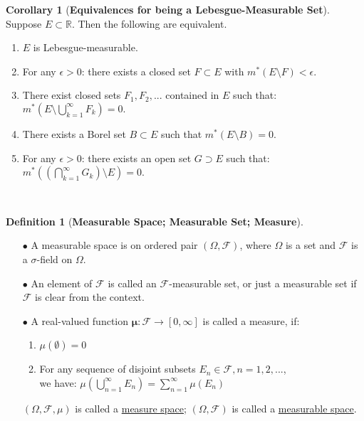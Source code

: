 \documentclass[reqno]{amsart}
\theoremstyle{definition}
\newtheorem{definition}{Definition}
\newtheorem{corollary}{Corollary}
\begin{document}
\newpage
\begin{corollary}[\textbf{Equivalences for being a Lebesgue-Measurable Set}]
\normalfont
~\\

Suppose $E \subset \mathbb{R}$. Then the following are equivalent.\\
\begin{enumerate}
\item $E$ is Lebesgue-measurable.\\
\item For any $\epsilon > 0$: there exists a closed set $F \subset E$ with $m^{*}(E \setminus F) < \epsilon$.\\
\item There exist closed sets $F_{1}, F_{2}, ...$ contained in $E$ such that:\\
$m^{*}\left( E \setminus\bigcup\limits^{\infty}_{k=1} F_{k} \right) = 0.$\\
\item There exists a Borel set $B \subset E$ such that $m^{*}\left( E \setminus B \right) = 0$.\\
\item For any $\epsilon > 0$: there exists an open set $G \supset E$ such that: \\
$m^{*}\left( \left( \bigcap\limits^{\infty}_{k=1} G_{k} \right) \setminus E \right) = 0$.
\end{enumerate}
\end{corollary}
~\\
\begin{definition}[\textbf{Measurable Space; Measurable Set; Measure}]{\mbox{}}
\begin{enumerate}
\normalfont
\item[$\bullet$] A measurable space is on ordered pair $\left( \Omega, \mathcal{F} \right)$, where $\Omega$ is a set and $\mathcal{F}$ is a $\sigma$-field on $\Omega$.\\

\item[$\bullet$] An element of $\mathcal{F}$ is called an $\mathcal{F}$-measurable set, or just a measurable set if $\mathcal{F}$ is clear from the context.\\

\item[$\bullet$] A real-valued function $\mathbf{\mu}: \mathcal{F} \rightarrow [0, \infty]$ is called a measure, if:
\begin{enumerate}
\item $\mu\left( \emptyset \right) = 0$
\item For any sequence of disjoint subsets $E_{n} \in \mathcal{F}, n = 1, 2, ...$, \\
we have: $\mu\left( \bigcup\limits^{\infty}_{n=1} E_{n} \right) = \sum\limits^{\infty}_{n=1}\mu\left( E_{n} \right)$
\end{enumerate}
$\left( \Omega, \mathcal{F}, \mu \right)$ is called a \underline{measure space}; $\left( \Omega, \mathcal{F} \right)$ is called a \underline{measurable space}.
\end{enumerate}
\end{definition}
\end{document}
